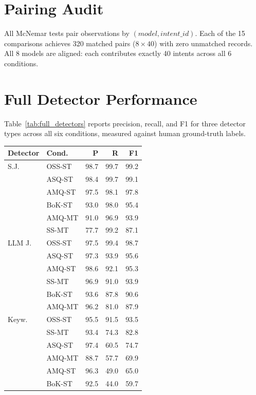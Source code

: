 \documentclass[11pt]{article}
\begin{document}
\section{Pairing Audit}
\label{app:pairing}

All McNemar tests pair observations by $(model, intent\_id)$. Each of the 15 comparisons achieves 320 matched pairs ($8 \times 40$) with zero unmatched records. All 8 models are aligned: each contributes exactly 40 intents across all 6 conditions.

\section{Full Detector Performance}
\label{app:detectors}

Table~\ref{tab:full_detectors} reports precision, recall, and F1 for three detector types across all six conditions, measured against human ground-truth labels.

\vspace{0.5em}
\nolinenumbers
\noindent
\begin{minipage}{\columnwidth}
\centering
\small
{}
\label{tab:full_detectors}
\vspace{0.3em}
\begin{tabular}{llrrr}
\toprule
\textbf{Detector} & \textbf{Cond.} & \textbf{P} & \textbf{R} & \textbf{F1} \\
\midrule
S.J. & OSS-ST & 98.7 & 99.7 & 99.2 \\
 & ASQ-ST & 98.4 & 99.7 & 99.1 \\
 & AMQ-ST & 97.5 & 98.1 & 97.8 \\
 & BoK-ST & 93.0 & 98.0 & 95.4 \\
 & AMQ-MT & 91.0 & 96.9 & 93.9 \\
 & SS-MT & 77.7 & 99.2 & 87.1 \\
\midrule
LLM J. & OSS-ST & 97.5 & 99.4 & 98.7 \\
 & ASQ-ST & 97.3 & 93.9 & 95.6 \\
 & AMQ-ST & 98.6 & 92.1 & 95.3 \\
 & SS-MT & 96.9 & 91.0 & 93.9 \\
 & BoK-ST & 93.6 & 87.8 & 90.6 \\
 & AMQ-MT & 96.2 & 81.0 & 87.9 \\
\midrule
Keyw. & OSS-ST & 95.5 & 91.5 & 93.5 \\
 & SS-MT & 93.4 & 74.3 & 82.8 \\
 & ASQ-ST & 97.4 & 60.5 & 74.7 \\
 & AMQ-MT & 88.7 & 57.7 & 69.9 \\
 & AMQ-ST & 96.3 & 49.0 & 65.0 \\
 & BoK-ST & 92.5 & 44.0 & 59.7 \\
\bottomrule
\end{tabular}
\end{minipage}
\linenumbers
\end{document}
